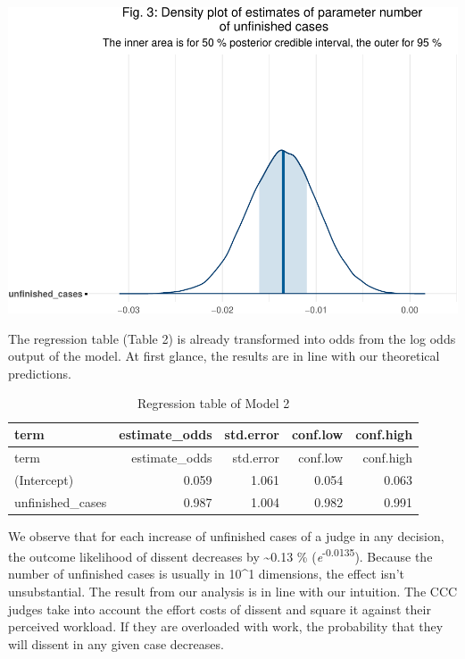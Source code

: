 \documentclass[
  11pt,
]{article}
\begin{document}
\includegraphics{dissents_article_anonymised_files/figure-latex/interpreting_posterior2-1.pdf}
\vspace{25pt}

The regression table (Table 2) is already transformed into odds from the
log odds output of the model. At first glance, the results are in line
with our theoretical predictions.

\begin{longtable}[]{@{}lrrrr@{}}
\caption{Regression table of Model 2}\tabularnewline
\toprule\noalign{}
term & estimate\_odds & std.error & conf.low & conf.high \\
\midrule\noalign{}
\endfirsthead
\toprule\noalign{}
term & estimate\_odds & std.error & conf.low & conf.high \\
\midrule\noalign{}
\endhead
\bottomrule\noalign{}
\endlastfoot
(Intercept) & 0.059 & 1.061 & 0.054 & 0.063 \\
unfinished\_cases & 0.987 & 1.004 & 0.982 & 0.991 \\
\end{longtable}

We observe that for each increase of unfinished cases of a judge in any
decision, the outcome likelihood of dissent decreases by
\textasciitilde0.13 \% (\emph{e}\textsuperscript{-0.0135}). Because the
number of unfinished cases is usually in 10\^{}1 dimensions, the effect
isn't unsubstantial. The result from our analysis is in line with our
intuition. The CCC judges take into account the effort costs of dissent
and square it against their perceived workload. If they are overloaded
with work, the probability that they will dissent in any given case
decreases.
\end{document}
